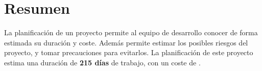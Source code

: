 
\section{Resumen}
La planificación de un proyecto permite al equipo de desarrollo conocer de forma estimada su duración y coste. Además 
permite estimar los posibles riesgos del proyecto, y tomar precauciones para evitarlos. La planificación de este 
proyecto estima una duración de \textbf{215 días} de trabajo, con un coste de \textbf{}.

